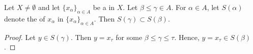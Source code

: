 \begin{prop}
    \label{def:NetSection}
	\rm
    Let $X \neq \emptyset$ 
    and let $\{x_\alpha\}_{\alpha \in A}$ 
    be a \Net in $X$. 
    Let $\beta \leq \gamma \in A$. 
    For $\alpha \in A$, let 
    $S(\alpha)$ denote the \NetSection
    of $x_\alpha$ in $\{x_\alpha\}_{\alpha \in A}$. 
    Then $S(\gamma) \subset S(\beta)$. 
    \begin{proof}
        Let $y \in S(\gamma)$.
        Then $y=x_\tau$ for some $\beta \leq \gamma \leq \tau$. 
        Hence, $y=x_\tau \in S(\beta)$. 
    \end{proof}
\end{prop}
